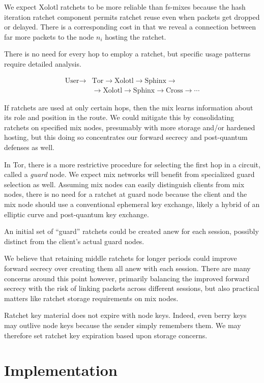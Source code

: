 \documentclass[twoside,letterpaper]{llncs}
\begin{document}
We expect Xolotl ratchets to be more reliable than fs-mixes because
the hash iteration ratchet component permits ratchet reuse even when
packets get dropped or delayed.  There is a corresponding cost in
that we reveal a connection between far more packets to the node
$n_i$ hosting the ratchet.

There is no need for every hop to employ a ratchet, %
but specific usage patterns require detailed analysis.

\[ \begin{aligned}
\textrm{User} \to &\textrm{Tor} \to \textrm{Xolotl} \to \textrm{Sphinx} \to \\
\quad &\to \textrm{Xolotl} \to \textrm{Sphinx} \to \textrm{Cross} \to \cdots 
\end{aligned} \]

If ratchets are used at only certain hops, then the mix learns
information about its role and position in the route.  
We could mitigate this by consolidating ratchets on specified mix
nodes, presumably with more storage and/or hardened hosting, but
this doing so concentrates our forward secrecy and post-quantum 
defenses as well.

In Tor, there is a more restrictive procedure for selecting the
first hop in a circuit, called a {\it guard} node.  We expect
mix networks will benefit from specialized guard selection as well.
Assuming mix nodes can easily distinguish clients from mix nodes,
there is no need for a ratchet at guard node because the client and
the mix node should use a conventional ephemeral key exchange,
likely a hybrid of an elliptic curve and post-quantum key exchange.

An initial set of ``guard'' ratchets could be created anew for each
session, possibly distinct from the client's actual guard nodes.

We believe that retaining middle ratchets for longer periods could
improve forward secrecy over creating them all anew with each session. 
There are many concerns around this point however, primarily balancing
the improved forward secrecy with the risk of linking packets across
different sessions, but also
 practical matters like ratchet storage requirements on mix nodes.  

Ratchet key material does not expire with node keys.  Indeed, even
berry keys may outlive node keys because the sender simply remembers
them.  We may therefore set ratchet key expiration based upon storage
concerns. 


\section{Implementation}
\end{document}
